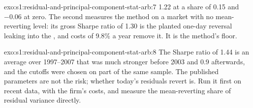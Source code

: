 \begin{solution}{exo:s1:residual-and-principal-component-stat-arb:7}
1.22 at a share of 0.15 and $-0.06$ at zero. The second measures the method on a market with no mean-reverting level: its gross Sharpe ratio of 1.30 is the
planted one-day reversal leaking into the , and costs of 9.8\% a year remove it. It is the method's floor.
\end{solution}

\begin{solution}{exo:s1:residual-and-principal-component-stat-arb:8}
The Sharpe ratio of 1.44 is an average over 1997--2007 that was much stronger before 2003 and 0.9 afterwards, and the cutoffs were chosen on part of the same
sample. The published parameters are not the risk; whether today's residuals revert is. Run it first on recent data, with the firm's costs, and measure the
mean-reverting share of residual variance directly.
\end{solution}

